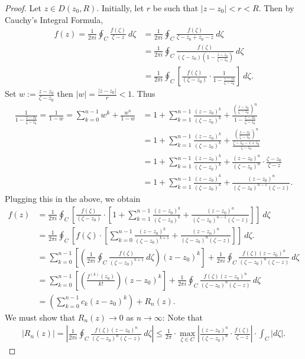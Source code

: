 \documentclass[12pt,openany]{book}
\theoremstyle{definition}
\newcommand{\of}[1]{\left( #1 \right)}
\newcommand{\abs}[1]{\left\lvert #1 \right\rvert}
\begin{document}
	\begin{proof}
		Let $z\in D(z_0,R)$. Initially, let $r$ be such that $\abs{z-z_0}<r<R$. Then by Cauchy's Integral Formula, \begin{align*}
		f(z)=\frac{1}{2\pi i}\oint_C\frac{f\of{\zeta}}{\zeta-z}\ d\zeta&=\frac{1}{2\pi i}\oint_C\frac{f\of{\zeta}}{\zeta-z_0+z_0-z}\ d\zeta\\
		&=\frac{1}{2\pi i}\oint_C\frac{f\of{\zeta}}{\of{\zeta-z_0}\of{\displaystyle 1-\frac{z-z_0}{\zeta-z_0}}}\ d\zeta\\
		&=\frac{1}{2\pi i}\oint_C\left[\frac{f\of{\zeta}}{\of{\zeta-z_0}}\cdot\frac{1}{\displaystyle 1-\frac{z-z_0}{\zeta-z_0}}\right]\ d\zeta.
		\end{align*} Set $w:=\displaystyle\frac{z-z_0}{\zeta-z_0}$ then $\abs{w}=\displaystyle\frac{\abs{z-z_0}}{r}<1$. Thus \begin{align*}
		\frac{1}{\displaystyle 1-\frac{z-z_0}{\zeta-z_0}}=\frac{1}{1-w}=\sum_{k=0}^{n-1}w^k+\frac{w^n}{1-w}
		&=1+\sum_{k=1}^{n-1}\frac{\of{z-z_0}^k}{\of{\zeta-z_0}^k}+\frac{\of{\displaystyle\frac{z-z_0}{\zeta-z_0}}^n}{1-\displaystyle\frac{z-z_0}{\zeta-z_0}}\\
		&=1+\sum_{k=1}^{n-1}\frac{\of{z-z_0}^k}{\of{\zeta-z_0}^k}+\frac{\of{\displaystyle\frac{z-z_0}{\zeta-z_0}}^n}{\displaystyle\frac{\zeta -z_0-z+z_0}{\zeta-z_0}}\\
		&=1+\sum_{k=1}^{n-1}\frac{\of{z-z_0}^k}{\of{\zeta-z_0}^k}+\frac{\of{z-z_0}^n}{\of{\zeta-z_0}^n}\cdot\frac{\zeta-z_0}{\zeta-z}\\
		&=1+\sum_{k=1}^{n-1}\frac{\of{z-z_0}^k}{\of{\zeta-z_0}^k}+\frac{\of{z-z_0}^n}{\of{\zeta-z_0}^{n-1}\of{\zeta-z}}.
		\end{align*}
		Plugging this in the above, we obtain \begin{align*}
		f(z)&=\frac{1}{2\pi i}\oint_C\left[\frac{f\of{\zeta}}{\of{\zeta-z_0}}\cdot\left[1+\sum_{k=1}^{n-1}\frac{\of{z-z_0}^k}{\of{\zeta-z_0}^k}+\frac{\of{z-z_0}^n}{\of{\zeta-z_0}^{n-1}\of{\zeta-z}}\right]\right]\ d\zeta\\
		&=\frac{1}{2\pi i}\oint_C\left[f\of{\zeta}\cdot\left[\sum_{k=0}^{n-1}\frac{\of{z-z_0}^k}{\of{\zeta-z_0}^{k+1}}+\frac{\of{z-z_0}^n}{\of{\zeta-z_0}^n\of{\zeta-z}}\right]\right]\ d\zeta.\\
		&=\sum_{k=0}^{n-1}\left[\of{\frac{1}{2\pi i}\oint_C\frac{f\of{\zeta}}{\of{\zeta-z_0}^{k+1}}\ d\zeta}\of{z-z_0}^k\right]+\frac{1}{2\pi i}\oint_C\frac{f\of{\zeta}\of{z-z_0}^n}{\of{\zeta-z_0}^n\of{\zeta- z}}\ d\zeta\\
		&=\sum_{k=0}^{n-1}\left[\of{\frac{f^{(k)}(z_0)}{k!}}\of{z-z_0}^k\right]+\frac{1}{2\pi i}\oint_C\frac{f\of{\zeta}\of{z-z_0}^n}{\of{\zeta-z_0}^n\of{\zeta- z}}\ d\zeta\\
		&=\of{\sum_{k=0}^{n-1}c_k\of{z-z_0}^k}+R_n(z).
		\end{align*} We must show that $R_n(z)\to 0$ as $n\to\infty$: Note that \begin{align*}
		\abs{R_n(z)}=\abs{\frac{1}{2\pi i}\oint_C\frac{f\of{\zeta}\of{z-z_0}^n}{\of{\zeta-z_0}^n\of{\zeta- z}}\ d\zeta}\leq \frac{1}{2\pi}\cdot\max_{\zeta\in C}\abs{\frac{\of{z-z_0}^n}{\of{\zeta-z_0}^n}\cdot\frac{f\of{\zeta}}{\zeta-z}}\cdot\int_C\abs{d\zeta}.
		\end{align*}
	\end{proof}
\end{document}
